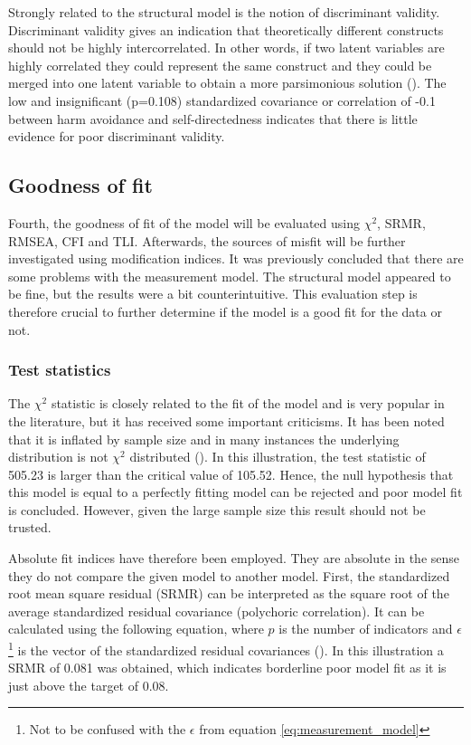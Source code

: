 \documentclass[11pt]{article}
\begin{document}
Strongly related to the structural model is the notion of discriminant validity.
Discriminant validity gives an indication that theoretically different
constructs should not be highly intercorrelated. In other words, if two latent
variables are highly correlated they could represent the same construct and they
could be merged into one latent variable to obtain a more parsimonious solution
(\cite{brown2015}). The low and insignificant (p=0.108) standardized covariance
or correlation of -0.1 between harm avoidance and self-directedness indicates
that there is little evidence for poor discriminant validity.

\subsection{Goodness of fit}

Fourth, the goodness of fit of the model will be evaluated using $\chi^2$, SRMR,
RMSEA, CFI and TLI. Afterwards, the sources of misfit will be further
investigated using modification indices. It was previously concluded that there
are some problems with the measurement model. The structural model appeared to
be fine, but the results were a bit counterintuitive. This evaluation step is
therefore crucial to further determine if the model is a good fit for the data
or not.

\subsubsection{Test statistics}

The $\chi^2$ statistic is closely related to the fit of the model and is very
popular in the literature, but it has received some important criticisms.
It has been noted that it is inflated by sample size and in many instances the
underlying distribution is not $\chi^2$ distributed (\cite{brown2015}).
In this illustration, the test statistic of 505.23 is larger than the critical
value of 105.52. Hence, the null hypothesis that this model is equal to a
perfectly fitting model can be rejected and poor model fit is concluded.
However, given the large sample size this result should not be trusted.

Absolute fit indices have therefore been employed. They are absolute in the
sense they do not compare the given model to another model.
First, the standardized root mean square residual (SRMR) can be
interpreted as the square root of the average standardized residual covariance
(polychoric correlation). It can be calculated using the following equation,
where $p$ is the number of indicators and $\epsilon$ \footnote{Not to be
confused with the $\epsilon$ from equation \ref{eq:measurement_model}} is the
vector of the standardized residual covariances (\cite{shi2020}). In this
illustration a SRMR of 0.081 was obtained, which indicates borderline poor model
fit as it is just above the target of 0.08.
\end{document}

